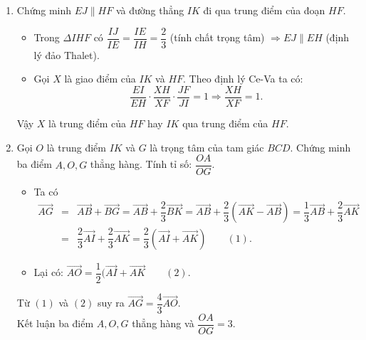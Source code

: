 \begin{bt}
{\begin{enumerate}
			\begin{itemize}
				\item Trong mặt phẳng $(ABC)$, dựng $EN  \parallel  AB, N \in AC$.
				\item Trong $\Delta ABC$ có $\dfrac{ CE}{CB}=\dfrac{EN}{AB}=\dfrac{1}{3} \Rightarrow \dfrac{EN}{AI}=\dfrac{2}{3}$.
				\item Trong $\Delta HAI$ có $\dfrac{ HE }{HI}=\dfrac{EN}{AI}=\dfrac{2}{3} \Rightarrow E$ là trọng tâm của $\Delta ABH$.
			\end{itemize}
			Vậy $\dfrac{HC}{HA}=\dfrac{1}{2}$.
			\item Chứng minh $EJ  \parallel  HF$ và đường thẳng $IK$ đi qua trung điểm của đoạn $HF$.\\
			\begin{itemize}
				\item Trong $\Delta IHF$ có $\dfrac{IJ}{IE}=\dfrac{IE}{IH}=\dfrac{2}{3}$ (tính chất trọng tâm) $\Rightarrow {EJ}  \parallel  EH$ (định lý đảo Thalet).
				\item Gọi $X$ là giao điểm của $IK$ và $HF$. Theo định lý Ce-Va ta có:\\
				$$\dfrac{EI}{EH} \cdot \dfrac{XH}{XF} \cdot \dfrac{JF}{JI}=1 \Rightarrow \dfrac{XH}{XF} =1.$$
			\end{itemize}
			Vậy $X$ là trung điểm của $HF$ hay $IK$ qua trung điểm của $HF$. 
			\item Gọi $O$ là trung điểm $IK$ và $G$ là trọng tâm của tam giác $BCD$. Chứng minh ba điểm $A, O, G$ thẳng hàng. Tính tỉ số: $\dfrac{OA}{OG}$.
			\begin{itemize}
				\item Ta có
				\begin{eqnarray*}
					\overrightarrow{AG} & =& \overrightarrow{AB}+\overrightarrow{BG}=\overrightarrow{AB}+\dfrac{2}{3} \overrightarrow{BK}=\overrightarrow{AB}+\dfrac{2}{3}(\overrightarrow{AK}-\overrightarrow{AB})=\dfrac{1}{3} \overrightarrow{AB}+\dfrac{2}{3} \overrightarrow{AK} \\
					&=& \dfrac{2}{3} \overrightarrow{AI}+\dfrac{2}{3} \overrightarrow{AK}=\dfrac{2}{3} \left(\overrightarrow{AI}+\overrightarrow{AK}\right) \quad \quad (1) .
				\end{eqnarray*}
				\item Lại có: $\overrightarrow{AO}=\dfrac{1}{2}(\overrightarrow{AI}+\overrightarrow{AK} \quad \quad (2)$.
			\end{itemize}
			Từ $(1)$ và $(2)$ suy ra $\overrightarrow{AG}=\dfrac{4}{3} \overrightarrow{AO}$.\\
			Kết luận ba điểm $A, O, G$ thẳng hàng và $\dfrac{OA}{OG}=3$.
		\end{enumerate}
		
	}
\end{bt}

